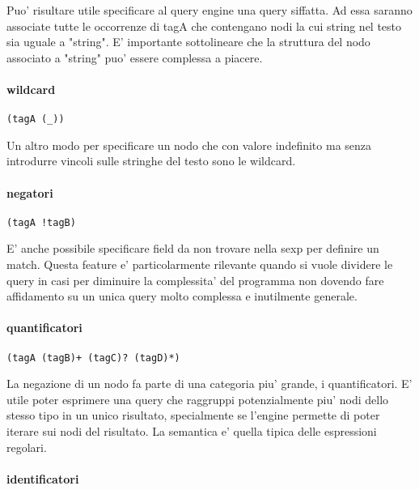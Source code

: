 Puo' risultare utile specificare al query engine una query siffatta.
Ad essa saranno associate tutte le occorrenze di tagA che contengano nodi la cui string nel testo sia uguale a "string".
E' importante sottolineare che la struttura del nodo associato a "string" puo' essere complessa a piacere.

\paragraph{wildcard}

\begin{Verbatim}[samepage=true]
(tagA (_))
\end{Verbatim}

Un altro modo per specificare un nodo che con valore indefinito ma senza introdurre vincoli sulle stringhe del testo sono le wildcard.

\paragraph{negatori}

\begin{Verbatim}[samepage=true]
(tagA !tagB)
\end{Verbatim}

E' anche possibile specificare field da non trovare nella sexp per definire un match.
Questa feature e' particolarmente rilevante quando si vuole dividere le query in casi per diminuire la complessita' del programma non dovendo fare affidamento su un unica query molto complessa e inutilmente generale.

\paragraph{quantificatori}

\begin{Verbatim}[samepage=true]
(tagA (tagB)+ (tagC)? (tagD)*)
\end{Verbatim}

La negazione di un nodo fa parte di una categoria piu' grande, i quantificatori.
E' utile poter esprimere una query che raggruppi potenzialmente piu' nodi dello stesso tipo in un unico risultato, specialmente se l'engine permette di poter iterare sui nodi del risultato.
La semantica e' quella tipica delle espressioni regolari.

\paragraph{identificatori}

